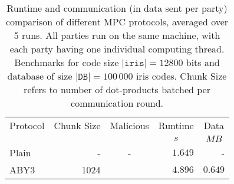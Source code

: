 \documentclass[a4paper,11pt,
]{article}
\newcommand{\xmark}{\ding{55}}%
\begin{document}
\begin{table}[ht]
    \centering
    \caption{Runtime and communication (in data sent per party) comparison of different MPC protocols, averaged over 5 runs. All parties run on the same machine, with each party having one individual computing thread. Benchmarks for code size $|\texttt{iris}| = 12800$ bits and database of size $|\texttt{DB}| = 100\,000$ iris codes. Chunk Size refers to number of dot-products batched per communication round.}
    \label{tab::bench_machine}
    \begin{tabular}{lrcrr}
        \toprule
        \multicolumn{1}{c}{Protocol} & \multicolumn{1}{c}{Chunk Size} & \multicolumn{1}{c}{Malicious} & \multicolumn{1}{c}{Runtime} & \multicolumn{1}{c}{Data} \\
                                     &                                &                               & \multicolumn{1}{c}{$s$}     & \multicolumn{1}{c}{$MB$} \\
        \midrule
        Plain                        & -                              & -                             & $1.649$                     & -                        \\
        ABY3                         & 1024                           & \xmark                        & $4.896$                     & $0.649$                  \\
        \bottomrule
    \end{tabular}
\end{table}
\end{document}
